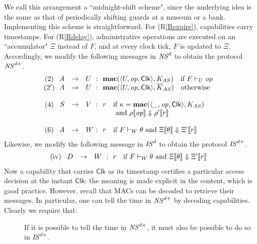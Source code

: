 \documentclass[10pt]{article}
\makeatletter
\newcounter{Crules}
\newcommand{\func}[1]{{\bf #1}}
\newcommand{\clk}{\mathsf{Clk}}
\newcommand{\op}{{\it op}}
\newcommand{\tup}[1]{\langle #1\rangle}
\newcommand{\R}{\addtocounter{Crules}{1}R\arabic{Crules}\gdef\@currentlabel{\arabic{Crules}}}
\makeatother
\begin{document}
\noindent
We call this arrangement a ``midnight-shift scheme", since the underlying idea is the same as that of periodically shifting guards at a museum or a bank. Implementing this scheme is straightforward. For (R\ref{Rexpire}), capabilities carry timestamps. For (R\ref{Rdelay}), administrative operations are executed on an ``accumulator" $\Xi$ instead of $F$, and at every clock tick, $F$ is updated to $\Xi$. Accordingly, we modify the following messages in ${\it NS}^d$ to obtain the protocol ${\it NS}^{d+}$. 
\[
\left.
\begin{array}{crclcl}
\!\!\!\! (2)\!\! & A & \rightarrow  & U\!\!\! & \!\!:\!\! & \!\func{mac}(\tup{U,\op,\clk},K_{AS})~~\mbox{ if }F \vdash_U \op \\
\!\!\!\! (2')\!\! & A & \rightarrow  & U\!\!\! & \!\!:\!\! & \!\func{mac}(\tup{U,\op,\clk},\overline K_{AS})~~\mbox{ otherwise }\\
\\
\!\!\!\! (4)\!\! & S & \rightarrow  & V\!\!\! & \!\!:\!\! & \!r~~\mbox{ if }\kappa = \func{mac}(\tup{\_,\op,\clk},K_{AS}) \\
 &&&&&~~~~\mbox{ and }\rho\llbracket\op\rrbracket \Downarrow \rho'\llbracket r\rrbracket \\
 \\
\!\!\!\! (6)\!\! & A & \rightarrow  & W\!\!\! & \!\!:\!\! & \!r~~\mbox{ if }F\vdash_W \theta\mbox{ and }\Xi\llbracket\theta \rrbracket \Downarrow \Xi'\llbracket r\rrbracket
\end{array}
\right.
\]
Likewise, we modify the following message in ${\it IS}^d$ to obtain the protocol ${\it IS}^{d+}$.
 \[
\left.
\begin{array}{crclcl}
  \!\!\!\!({\rm iv})\! & D & \rightarrow  & W & \!\!:\!\! & r~~\mbox{ if }F\vdash_W \theta\mbox{ and }\Xi\llbracket\theta \rrbracket \Downarrow \Xi'\llbracket r\rrbracket 
\end{array}
\right.
\]
Now a capability that carries $\clk$ as its timestamp certifies a particular access decision at the instant $\clk$: the meaning is made explicit in the content, which is good practice. However, recall that MACs can be decoded to retrieve their messages. In particular, one can tell the time in ${\it NS}^{d+}$ by decoding capabilities. Clearly we require that:
\begin{description}
\item[\R]\label{Rtime} If it is possible to tell the time in ${\it NS}^{d+}$, it must also be possible to do so in ${\it IS}^{d+}$.
\end{description}
\end{document}
